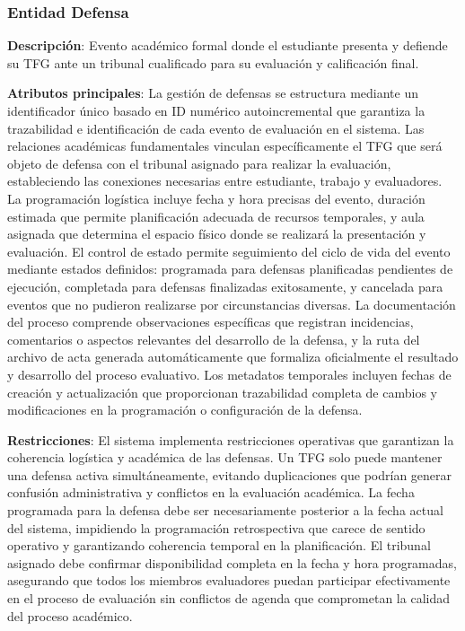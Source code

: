 \documentclass[12pt,a4paper,oneside]{report}
\begin{document}
\subsubsection{Entidad Defensa}\label{entidad-defensa}

\textbf{Descripción}: Evento académico formal donde el estudiante presenta y defiende su TFG ante un tribunal cualificado para su evaluación y calificación final.

\textbf{Atributos principales}: La gestión de defensas se estructura mediante un identificador único basado en ID numérico autoincremental que garantiza la trazabilidad e identificación de cada evento de evaluación en el sistema. Las relaciones académicas fundamentales vinculan específicamente el TFG que será objeto de defensa con el tribunal asignado para realizar la evaluación, estableciendo las conexiones necesarias entre estudiante, trabajo y evaluadores. La programación logística incluye fecha y hora precisas del evento, duración estimada que permite planificación adecuada de recursos temporales, y aula asignada que determina el espacio físico donde se realizará la presentación y evaluación. El control de estado permite seguimiento del ciclo de vida del evento mediante estados definidos: programada para defensas planificadas pendientes de ejecución, completada para defensas finalizadas exitosamente, y cancelada para eventos que no pudieron realizarse por circunstancias diversas. La documentación del proceso comprende observaciones específicas que registran incidencias, comentarios o aspectos relevantes del desarrollo de la defensa, y la ruta del archivo de acta generada automáticamente que formaliza oficialmente el resultado y desarrollo del proceso evaluativo. Los metadatos temporales incluyen fechas de creación y actualización que proporcionan trazabilidad completa de cambios y modificaciones en la programación o configuración de la defensa.

\textbf{Restricciones}: El sistema implementa restricciones operativas que garantizan la coherencia logística y académica de las defensas. Un TFG solo puede mantener una defensa activa simultáneamente, evitando duplicaciones que podrían generar confusión administrativa y conflictos en la evaluación académica. La fecha programada para la defensa debe ser necesariamente posterior a la fecha actual del sistema, impidiendo la programación retrospectiva que carece de sentido operativo y garantizando coherencia temporal en la planificación. El tribunal asignado debe confirmar disponibilidad completa en la fecha y hora programadas, asegurando que todos los miembros evaluadores puedan participar efectivamente en el proceso de evaluación sin conflictos de agenda que comprometan la calidad del proceso académico.
\end{document}
